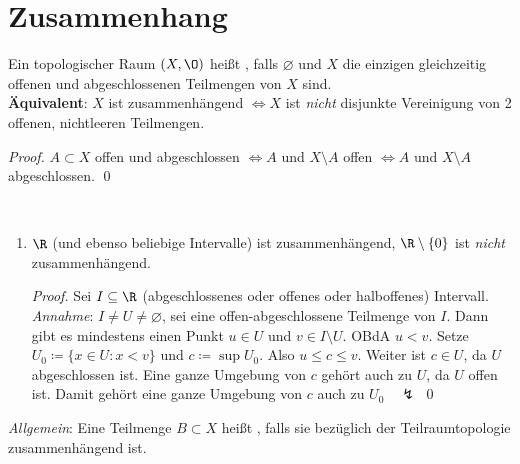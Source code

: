 \section{Zusammenhang}

\begin{definition}[Zusammenhängend]\label{def:zusammenhaengend}
  Ein topologischer Raum \( (X, \O) \) heißt , falls \( \varnothing \) und \( X \) die einzigen gleichzeitig offenen und abgeschlossenen Teilmengen von \( X \) sind. \\
  \textbf{Äquivalent}: \( X \) ist zusammenhängend \( \Leftrightarrow X \) ist \emph{nicht} disjunkte Vereinigung von 2 offenen, nichtleeren Teilmengen.
  \begin{proof}
    \( A \subset X \) offen und abgeschlossen \( \Leftrightarrow A \) und \( X \setminus A \) offen \( \Leftrightarrow A \) und \( X \setminus A \) abgeschlossen. \qed{}
  \end{proof}
\end{definition}

\begin{example}[Zusammenhang]
  \
  \begin{enumerate}
    \item \( \R \) (und ebenso beliebige Intervalle) ist zusammenhängend, \( \R \setminus \{ 0 \} \) ist \emph{nicht} zusammenhängend.
    \begin{proof}
      Sei \( I \subseteq \R \) (abgeschlossenes oder offenes oder halboffenes) Intervall. \\
      \emph{Annahme}: \( I \neq U \neq \varnothing \), sei eine offen-abgeschlossene Teilmenge von \( I \). Dann gibt es mindestens einen Punkt \( u \in U \) und \( v \in I \setminus U \). OBdA \( u < v \). Setze \( U_0 \coloneqq \{ x \in U : x < v \} \) und \( c \coloneqq \sup U_0 \). Also \( u \leq c \leq v \). Weiter ist \( c \in U \), da \( U \) abgeschlossen ist. Eine ganze Umgebung von \( c \) gehört auch zu \( U \), da \( U \) offen ist. Damit gehört eine ganze Umgebung von \( c \) auch zu \( U_0 \quad \lightning \) \qed{}
    \end{proof}
  \end{enumerate}
\end{example}

\begin{remark}
  \emph{Allgemein}: Eine Teilmenge \( B \subset X \) heißt , falls sie bezüglich der Teilraumtopologie zusammenhängend ist.
\end{remark}

